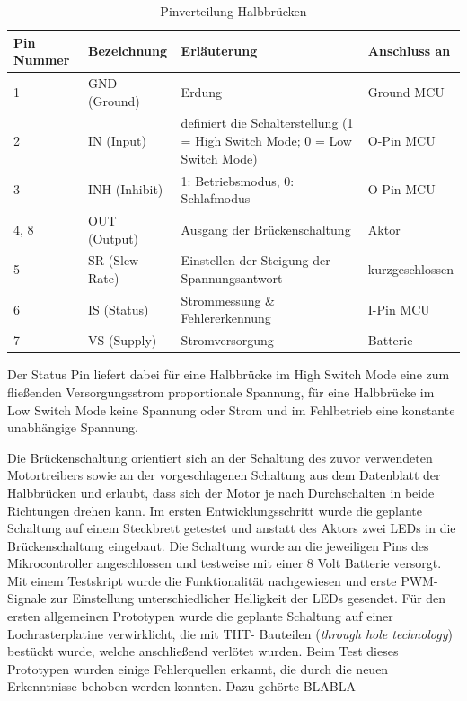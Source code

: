 \begin{table}[h]
	\centering
		\begin{tabular}{l|p{}|p{8cm}|p{3cm}}
			\textbf{Pin Nummer} & \textbf{Bezeichnung} & \textbf{Erläuterung} & \textbf{Anschluss an} \\ \hline
			1 & GND (Ground) & Erdung & Ground MCU \\
			2 & IN (Input) & definiert die Schalterstellung (1 = High Switch Mode; 0 = Low Switch Mode) & O-Pin MCU \\
			3 & INH (Inhibit) & 1: Betriebsmodus, 0: Schlafmodus & O-Pin MCU \\
			4, 8 & OUT (Output) & Ausgang der Brückenschaltung & Aktor \\
			5 & SR (Slew Rate) & Einstellen der Steigung der Spannungsantwort & kurzgeschlossen \\
			6 & IS (Status) & Strommessung \& Fehlererkennung & I-Pin MCU\\
			7 & VS (Supply) & Stromversorgung & Batterie\\
		\end{tabular}
	\caption{Pinverteilung Halbbrücken}
	\label{tab:Pinverteilung}
\end{table}
Der Status Pin liefert dabei für eine Halbbrücke im High Switch Mode eine zum fließenden Versorgungsstrom proportionale Spannung, für eine Halbbrücke im Low Switch Mode keine Spannung oder Strom und im Fehlbetrieb eine konstante unabhängige Spannung.


Die Brückenschaltung orientiert sich an der Schaltung des zuvor verwendeten Motortreibers sowie an der vorgeschlagenen Schaltung aus dem Datenblatt der Halbbrücken und erlaubt, dass sich der Motor je nach Durchschalten in beide Richtungen drehen kann.
Im ersten Entwicklungsschritt wurde die geplante Schaltung auf einem Steckbrett getestet und anstatt des Aktors zwei LEDs in die Brückenschaltung eingebaut. Die Schaltung wurde an die jeweiligen Pins des Mikrocontroller angeschlossen und testweise mit einer 8 Volt Batterie versorgt. Mit einem Testskript wurde die Funktionalität nachgewiesen und erste PWM-Signale zur Einstellung unterschiedlicher Helligkeit der LEDs gesendet.
Für den ersten allgemeinen Prototypen wurde die geplante Schaltung auf einer Lochrasterplatine verwirklicht, die mit THT- Bauteilen (\textit{through hole technology}) bestückt wurde, welche anschließend verlötet wurden.  
Beim Test dieses Prototypen wurden einige Fehlerquellen erkannt, die durch die neuen Erkenntnisse behoben werden konnten. Dazu gehörte BLABLA

